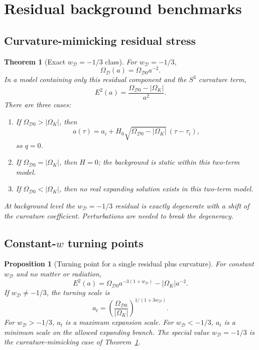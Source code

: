 \documentclass[
  aps,
  prd,
  reprint,
  superscriptaddress,
  nofootinbib,
  floatfix,
  longbibliography
]{revtex4-2}
\newtheorem{proposition}{Proposition}
\newtheorem{theorem}{Theorem}
\newcommand{\D}{\mathcal D}
\begin{document}
\section{Residual background benchmarks}
\label{sec:bg}

\subsection{Curvature-mimicking residual stress}

\begin{theorem}[Exact \(w_\D=-1/3\) class]
\label{thm:wm13}
For \(w_\D=-1/3\),
\[
  \Omega_\D(a)=\Omega_{\D0}a^{-2}.
\]
In a model containing only this residual component and the \(S^3\) curvature term,
\begin{equation}
  E^2(a)=\frac{\Omega_{\D0}-|\Omega_K|}{a^2}.
  \label{eq:wm13}
\end{equation}
There are three cases:
\begin{enumerate}
\item If \(\Omega_{\D0}>|\Omega_K|\), then
\begin{equation}
  a(\tau)=a_i+H_0\sqrt{\Omega_{\D0}-|\Omega_K|}\,(\tau-\tau_i),
  \label{eq:coast}
\end{equation}
so \(q=0\).
\item If \(\Omega_{\D0}=|\Omega_K|\), then \(H=0\); the background is static
within this two-term model.
\item If \(\Omega_{\D0}<|\Omega_K|\), then no real expanding solution exists in
this two-term model.
\end{enumerate}
At background level the \(w_\D=-1/3\) residual is exactly degenerate with a shift
of the curvature coefficient.  Perturbations are needed to break the degeneracy.
\end{theorem}

\subsection{Constant-\texorpdfstring{\(w\)}{w} turning points}

\begin{proposition}[Turning point for a single residual plus curvature]
\label{prop:turning}
For constant \(w_\D\) and no matter or radiation,
\begin{equation}
  E^2(a)=\Omega_{\D0}a^{-3(1+w_\D)}-|\Omega_K|a^{-2}.
\end{equation}
If \(w_\D\ne -1/3\), the turning scale is
\begin{equation}
  a_t=
  \left(\frac{\Omega_{\D0}}{|\Omega_K|}\right)^{1/(1+3w_\D)} .
  \label{eq:at}
\end{equation}
For \(w_\D>-1/3\), \(a_t\) is a maximum expansion scale.  For
\(w_\D<-1/3\), \(a_t\) is a minimum scale on the allowed expanding branch.
The special value \(w_\D=-1/3\) is the curvature-mimicking case of
Theorem~\ref{thm:wm13}.
\end{proposition}
\end{document}
